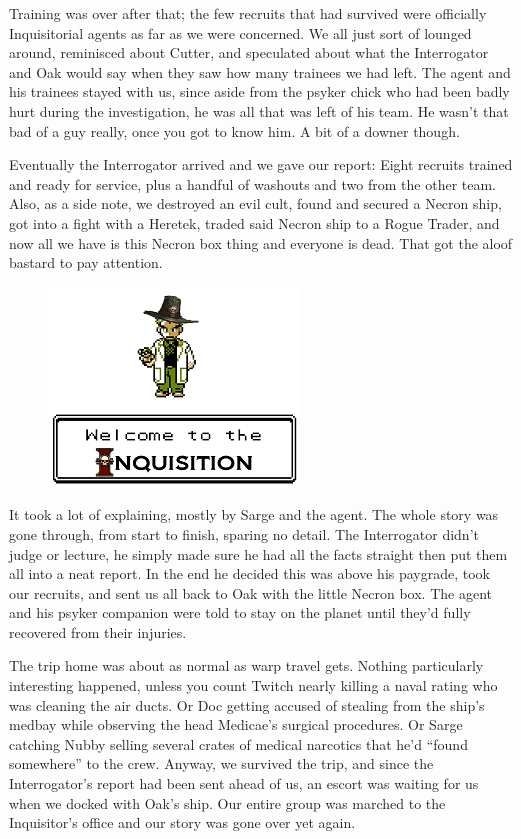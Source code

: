 Training was over after that; 
the few recruits that had survived were officially Inquisitorial agents as far as we were concerned. 
We all just sort of lounged around, reminisced about Cutter, and speculated about what the Interrogator and Oak would say when they saw how many trainees we had left. 
The agent and his trainees stayed with us, since aside from the psyker chick who had been badly hurt during the investigation, he was all that was left of his team. 
He wasn’t that bad of a guy really, once you got to know him. 
A bit of a downer though.

Eventually the Interrogator arrived and we gave our report: 
Eight recruits trained and ready for service, plus a handful of washouts and two from the other team. 
Also, as a side note, we destroyed an evil cult, found and secured a Necron ship, got into a fight with a Heretek, traded said Necron ship to a Rogue Trader, and now all we have is this Necron box thing and everyone is dead. 
That got the aloof bastard to pay attention.

\begin{figure}
	\begin{center}
		\includegraphics[width=\figwidth]{pics/8/61.png}
	\end{center}
\end{figure}
It took a lot of explaining, mostly by Sarge and the agent. 
The whole story was gone through, from start to finish, sparing no detail. 
The Interrogator didn’t judge or lecture, he simply made sure he had all the facts straight then put them all into a neat report. 
In the end he decided this was above his paygrade, took our recruits, and sent us all back to Oak with the little Necron box. 
The agent and his psyker companion were told to stay on the planet until they’d fully recovered from their injuries.

The trip home was about as normal as warp travel gets. 
Nothing particularly interesting happened, unless you count Twitch nearly killing a naval rating who was cleaning the air ducts. 
Or Doc getting accused of stealing from the ship’s medbay while observing the head Medicae’s surgical procedures. 
Or Sarge catching Nubby selling several crates of medical narcotics that he’d “found somewhere” to the crew. 
Anyway, we survived the trip, and since the Interrogator’s report had been sent ahead of us, an escort was waiting for us when we docked with Oak’s ship. 
Our entire group was marched to the Inquisitor’s office and our story was gone over yet again.


